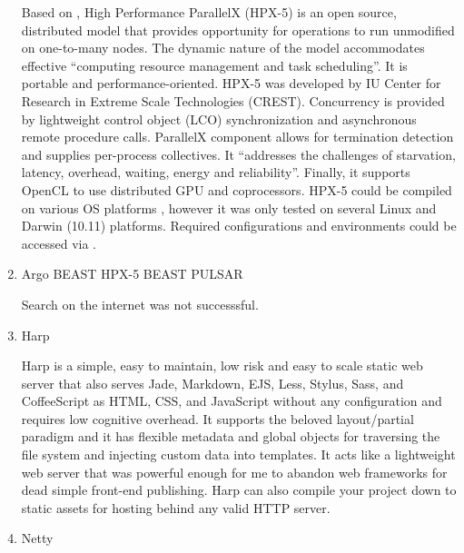 \begin{enumerate}
Based on \label{\detokenize{i524/technologies:id308}}{\hyperref[\detokenize{i524/technologies:www-hpx-5}]{\sphinxcrossref{{[}260{]}}}}, High Performance ParallelX (HPX-5)
is an open source, distributed model that provides opportunity
for operations to run unmodified on one-to-many nodes. The
dynamic nature of the model accommodates effective “computing
resource management and task scheduling”. It is portable and
performance-oriented. HPX-5 was developed by IU Center for
Research in Extreme Scale Technologies (CREST). Concurrency is
provided by lightweight control object (LCO) synchronization and
asynchronous remote procedure calls. ParallelX component allows
for termination detection and supplies per-process
collectives. It “addresses the challenges of starvation, latency,
overhead, waiting, energy and reliability”. Finally, it supports
OpenCL to use distributed GPU and coprocessors. HPX-5 could be
compiled on various OS platforms , however it was only tested on
several Linux and Darwin (10.11) platforms. Required
configurations and environments could be accessed via
\label{\detokenize{i524/technologies:id309}}{\hyperref[\detokenize{i524/technologies:www-hpx-5-user-guide}]{\sphinxcrossref{{[}261{]}}}}.

\item {} 
Argo BEAST HPX-5 BEAST PULSAR

Search on the internet was not successsful.

\item {} 
Harp

Harp \label{\detokenize{i524/technologies:id310}}{\hyperref[\detokenize{i524/technologies:www-harp}]{\sphinxcrossref{{[}262{]}}}} is a simple, easy to maintain, low risk and
easy to scale static web server that also serves Jade, Markdown,
EJS, Less, Stylus, Sass, and CoffeeScript as HTML, CSS, and
JavaScript without any configuration and requires low cognitive
overhead. It supports the beloved layout/partial paradigm and it
has flexible metadata and global objects for traversing the file
system and injecting custom data into templates. It acts like a
lightweight web server that was powerful enough for me to abandon
web frameworks for dead simple front-end publishing. Harp can
also compile your project down to static assets for hosting
behind any valid HTTP server.

\item {} 
Netty


\end{enumerate}
